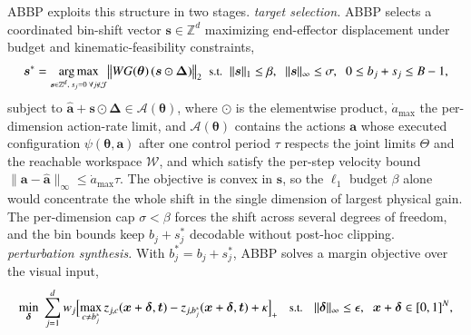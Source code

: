 
ABBP exploits this structure in two stages.
 \emph{target selection.} ABBP selects a coordinated bin-shift vector $\bm{s}\in\mathbb{Z}^{d}$ maximizing end-effector displacement under  budget and kinematic-feasibility constraints,
\begin{equation}
  \small
\bm{s}^{*}=\argmax_{\substack{\bm{s}\in\mathbb{Z}^{d},\; s_j=0\;\forall j\notin\mathcal{J}}}
\bigl\|W G(\bm{\theta})\,(\bm{s}\odot\bm{\Delta})\bigr\|_{2}
\;\;\text{s.t.}\;\;
\|\bm{s}\|_{1}\le\beta,\;\;
\|\bm{s}\|_{\infty}\le\sigma,\;\;
0\le b_j+s_j\le B-1,
\label{eq:abbp-shift}
\vspace{-1.5ex}\end{equation}
subject to $\hat{\bm{a}}+\bm{s}\odot\bm{\Delta}\in\mathcal{A}(\bm{\theta})$, where $\odot$ is the elementwise product, $\dot a_{\max}$ the per-dimension action-rate limit, and $\mathcal{A}(\bm{\theta})$ contains the actions $\bm{a}$ whose executed configuration $\psi(\bm{\theta},\bm{a})$ after one control period $\tau$ respects the joint limits $\Theta$ and the reachable workspace $\mathcal{W}$, and which satisfy the per-step velocity bound $\|\bm{a}-\hat{\bm{a}}\|_{\infty}\le\dot a_{\max}\tau$. The objective is convex in $\bm{s}$, so the $\ell_1$ budget $\beta$ alone would concentrate the whole shift in the single dimension of largest physical gain. The per-dimension cap $\sigma<\beta$ forces the shift across several degrees of freedom, and the bin bounds keep $b_j+s_j^{*}$ decodable without post-hoc clipping.
 \emph{perturbation synthesis.} With $b_j^{*}=b_j+s_j^{*}$, ABBP solves a margin objective over the visual input,
\begin{equation}
  \small
\min_{\bm{\delta}}\;\sum_{j=1}^{d} w_j
\Bigl[\max_{c\neq b_j^{*}} z_{j,c}(\bm{x}+\bm{\delta},\bm{t})-z_{j,b_j^{*}}(\bm{x}+\bm{\delta},\bm{t})+\kappa\Bigr]_{+}
\quad\text{s.t.}\quad
\|\bm{\delta}\|_{\infty}\le\epsilon,\;\;\bm{x}+\bm{\delta}\in[0,1]^{N},
\label{eq:abbp-obj}
\vspace{-1.5ex}\end{equation}
